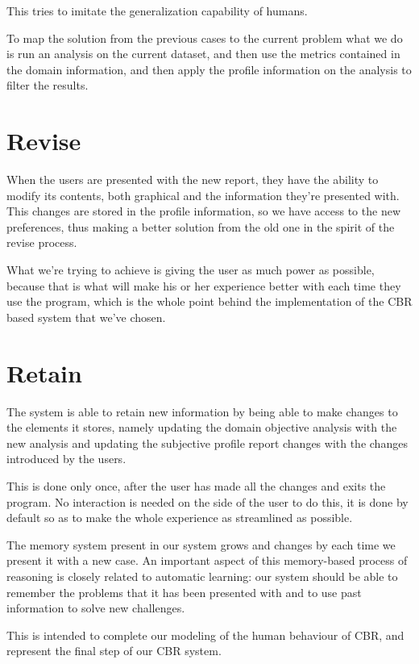 This tries to imitate the generalization capability of humans.

To map the solution from the previous cases to the current problem what we do is run an analysis on the current dataset, and then use the metrics contained in the domain information, and then apply the profile information on the analysis to filter the results.

\section{Revise}
\label{cap1:sec:revise}
When the users are presented with the new report, they have the ability to modify its contents, both graphical and the information they're presented with. This changes are stored in the profile information, so we have access to the new preferences, thus making a better solution from the old one in the spirit of the revise process.

What we're trying to achieve is giving the user as much power as possible, because that is what will make his or her experience better with each time they use the program, which is the whole point behind the implementation of the CBR based system that we've chosen.

\section{Retain}
\label{cap1:sec:retain}
The system is able to retain new information by being able to make changes to the elements it stores, namely updating the domain objective analysis with the new analysis and updating the subjective profile report changes with the changes introduced by the users.

This is done only once, after the user has made all the changes and exits the program. No interaction is needed on the side of the user to do this, it is done by default so as to make the whole experience as streamlined as possible.

The memory system present in our system grows and changes by each time we present it with a new case. An important aspect of this memory-based process of reasoning is closely related to automatic learning: our system should be able to remember the problems that it has been presented with and to use past information to solve new challenges.

This is intended to complete our modeling of the human behaviour of CBR, and represent the final step of our CBR system.

